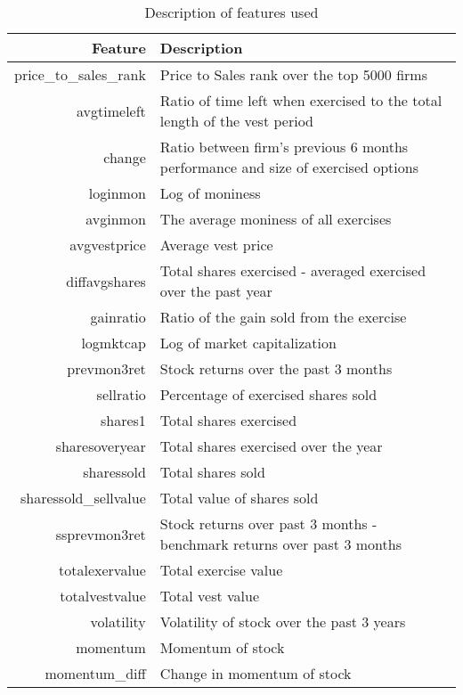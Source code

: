 \documentclass[twoside,11pt]{article}
\begin{document}
\begin{table}[htbp]
  \centering
  \caption{Description of features used}
    \begin{tabular}{rp{8cm}}
    \hline
    Feature & Description \bigstrut\\
    \hline
    price\_to\_sales\_rank & Price to Sales rank over the top 5000 firms \bigstrut[t]\\
    avgtimeleft & Ratio of time left when exercised to the total length of the vest period \\
    change & Ratio between firm's previous 6 months performance and size of exercised options \\
    loginmon & Log of moniness \\
    avginmon & The average moniness of all exercises \\
    avgvestprice & Average vest price \\
    diffavgshares & Total shares exercised - averaged exercised over the past year \\
    gainratio & Ratio of the gain sold from the exercise \\
    logmktcap & Log of market capitalization \\
    prevmon3ret & Stock returns over the past 3 months \\
    sellratio & Percentage of exercised shares sold \\
    shares1 & Total shares exercised \\
    sharesoveryear & Total shares exercised over the year \\
    sharessold & Total shares sold \\
    sharessold\_sellvalue & Total value of shares sold \\
    ssprevmon3ret & Stock returns over past 3 months - benchmark returns over past 3 months \\
    totalexervalue & Total exercise value \\
    totalvestvalue & Total vest value \\
    volatility & Volatility of stock over the past 3 years \\
    momentum & Momentum of stock \\
    momentum\_diff & Change in momentum of stock \bigstrut[b]\\
    \hline
    \end{tabular}%
  \label{realvardescrip}%
\end{table}%
\end{document}
